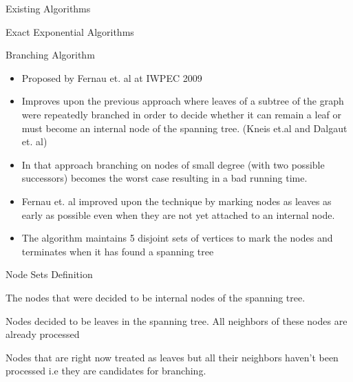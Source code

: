 \documentclass[xcolor=svgnames]{beamer}
\begin{document}
\begin{section}{Existing Algorithms}
\begin{subsection}{Exact Exponential Algorithms}
        \begin{frame}{Branching Algorithm}
            \begin{itemize}
                \item Proposed by Fernau et. al at IWPEC 2009
                \item Improves upon the previous approach where leaves of a subtree of the graph were repeatedly branched in order to decide whether it can remain a leaf or must become an internal node of the spanning tree. (Kneis et.al and Dalgaut et. al)
                \item In that approach branching on nodes of small degree (with two possible successors) becomes the worst case resulting in a bad running time.
                \item Fernau et. al improved upon the technique by marking nodes as leaves as early as possible even when they are not yet attached to an internal node.
                \item The algorithm maintains 5 disjoint sets of vertices to mark the nodes and terminates when it has found a spanning tree
            \end{itemize}
        \end{frame}
        \begin{frame}{Node Sets Definition}
            \begin{description}[<+->]
                \item[Internal Nodes(IN):] The nodes that were decided to be internal nodes of the spanning tree.
                \item[Leaf Nodes(LN):]Nodes decided to be leaves in the spanning tree. All neighbors of these nodes are already processed
                \item[Branching Nodes(BN):] Nodes that are right now treated as leaves but all their neighbors haven't been processed i.e they are candidates for branching.  
            \end{description}
            \centering
\end{frame}
\end{subsection}
\end{section}
\end{document}
